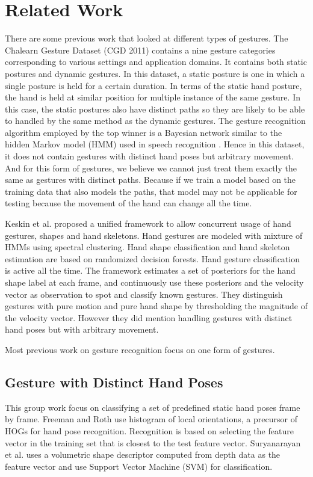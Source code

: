 \documentclass[conference]{IEEEtran}
\begin{document}
\section{Related Work}\label{sec:related}
There are some previous work that looked at different types of gestures. The
Chalearn Gesture Dataset (CGD 2011) \cite{guyon13} contains a nine gesture categories corresponding to various settings and application domains. It
contains both static postures and dynamic gestures. In this dataset, a static
posture is one in which a single posture is held for a certain duration. In
terms of the static hand posture, the hand is held at similar position for
multiple instance of the same gesture. In this case, the
static postures also have distinct paths so they are likely to be able to
handled by the same method as the dynamic gestures. The gesture recognition
algorithm employed by the top winner is a Bayesian network similar to the hidden
Markov model (HMM) used in speech recognition \cite{guyon13results}. Hence in
this dataset, it does not contain gestures with distinct hand poses but
arbitrary movement. And for this form of gestures, we believe we cannot just
treat them exactly the same as gestures with distinct paths. Because if we train
a model based on the training data that also models the paths, that model may
not be applicable for testing because the movement of the hand can change all
the time.

Keskin et al. \cite{keskin12} proposed a unified framework to allow concurrent
usage of hand gestures, shapes and hand skeletons. Hand gestures are modeled
with mixture of HMMs using spectral clustering. Hand shape classification and
hand skeleton estimation are based on randomized decision forests. Hand
gesture classification is active all the time. The framework estimates a set of
posteriors for the hand shape label at each frame, and continuously use these
posteriors and the velocity vector as observation to spot and classify known
gestures. They distinguish gestures with pure motion and pure hand shape by
thresholding the magnitude of the velocity vector. However they did mention
handling gestures with distinct hand poses but with arbitrary movement.

\cite{Oka02}

Most previous work on gesture recognition focus on one form of gestures.
\subsection{Gesture with Distinct Hand Poses}
This group work focus on classifying a set of predefined static hand
poses frame by frame. Freeman and Roth \cite{freeman95} use histogram of local
orientations, a precursor of HOGs for hand pose recognition. Recognition is based on selecting the feature vector in the training set that is closest to the test feature
vector. Suryanarayan et al. \cite{suryanarayan2010} uses a volumetric shape
descriptor computed from depth data as the feature vector and use Support
Vector Machine (SVM) for classification.
\end{document}
